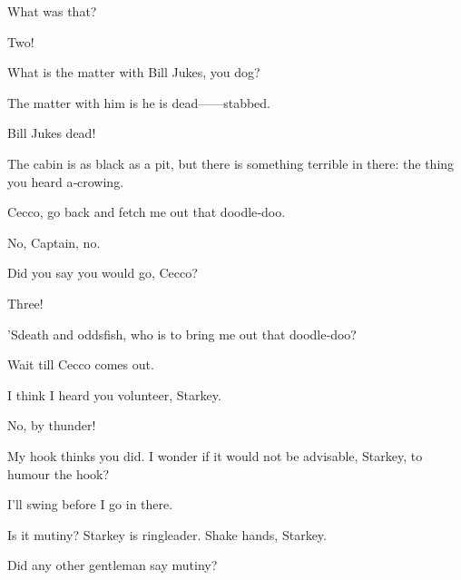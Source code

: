 \begin{drama}
\hookspeaks
What was that?

Two!


What is the matter with Bill Jukes, you dog?

\ceccospeaks
The matter with him is he is dead——stabbed.

Bill Jukes dead!

\ceccospeaks
The cabin is as black as a pit, but there is something terrible in there:
the thing you heard a‐crowing.

Cecco, go back and fetch me out that doodle‐doo.

No, Captain, no.

Did you say you would go, Cecco?


Three!

\hookspeaks
’Sdeath and oddsfish, who is to bring me out that doodle‐doo?


Wait till Cecco comes out.


\hookspeaks
I think I heard you volunteer, Starkey.

No, by thunder!

My hook thinks you did.
I wonder if it would not be advisable, Starkey, to humour the hook?

\starkeyspeaks
I’ll swing before I go in there.

Is it mutiny?
Starkey is ringleader.
Shake hands, Starkey.


Did any other gentleman say mutiny?


\end{drama}
